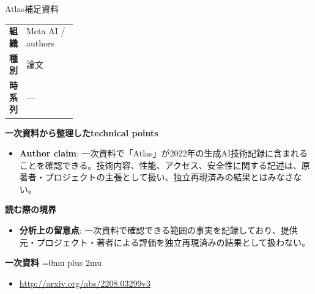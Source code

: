 \begin{technicalnote}{Atlas}{補足資料}
\begingroup
\begin{tabularx}{\linewidth}{@{}>{\bfseries}p{0.22\linewidth}X@{}}
組織 & Meta AI / authors \\
種別 & 論文 \\
時系列 & — \\
\end{tabularx}
\smallskip
{\bfseries 一次資料から整理したtechnical points}
\begin{itemize}[leftmargin=1.5em,itemsep=0.35em]
\item \textbf{Author claim}: 一次資料で「Atlas」が2022年の生成AI技術記録に含まれることを確認できる。技術内容、性能、アクセス、安全性に関する記述は、原著者・プロジェクトの主張として扱い、独立再現済みの結果とはみなさない。
\end{itemize}
\begin{minipage}{\linewidth}
{\bfseries 読む際の境界}
\begin{itemize}[leftmargin=1.5em,itemsep=0.35em]
\item \textbf{分析上の留意点}: 一次資料で確認できる範囲の事実を記録しており、提供元・プロジェクト・著者による評価を独立再現済みの結果として扱わない。
\end{itemize}
\begin{samepage}
{\bfseries 一次資料}
\begingroup\sloppy
\Urlmuskip=0mu plus 2mu\relax
\begin{itemize}[leftmargin=1.5em,itemsep=0.25em]
\item {\scriptsize\url{http://arxiv.org/abs/2208.03299v3}}
\end{itemize}
\endgroup
\end{samepage}
\end{minipage}
\endgroup
\end{technicalnote}
\medskip
